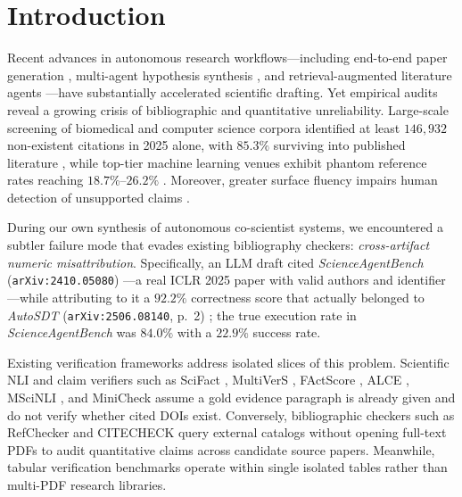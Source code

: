 \documentclass[10pt,twocolumn]{article}
\begin{document}
\section{Introduction}
Recent advances in autonomous research workflows---including end-to-end paper generation \cite{lu2024aiscientist}, multi-agent hypothesis synthesis \cite{gottweis2025coscientist,mitchener2025kosmos}, and retrieval-augmented literature agents \cite{skarlinski2024paperqa2,fischer2026muninai}---have substantially accelerated scientific drafting. Yet empirical audits reveal a growing crisis of bibliographic and quantitative unreliability. Large-scale screening of biomedical and computer science corpora identified at least $146{,}932$ non-existent citations in 2025 alone, with $85.3\%$ surviving into published literature \cite{zhao2026hallucinations}, while top-tier machine learning venues exhibit phantom reference rates reaching $18.7\%$--$26.2\%$ \cite{russinovich2026phantom}. Moreover, greater surface fluency impairs human detection of unsupported claims \cite{liu2023verifiability,li2024attributionbench}.

During our own synthesis of autonomous co-scientist systems, we encountered a subtler failure mode that evades existing bibliography checkers: \emph{cross-artifact numeric misattribution}. Specifically, an LLM draft cited \emph{ScienceAgentBench} (\texttt{arXiv:2410.05080}) \cite{chen2025scienceagentbench}---a real ICLR 2025 paper with valid authors and identifier---while attributing to it a $92.2\%$ correctness score that actually belonged to \emph{AutoSDT} (\texttt{arXiv:2506.08140}, p.~2) \cite{li2025autosdt}; the true execution rate in \emph{ScienceAgentBench} was $84.0\%$ with a $22.9\%$ success rate.

Existing verification frameworks address isolated slices of this problem. Scientific NLI and claim verifiers such as SciFact \cite{wadden2020scifact}, MultiVerS \cite{wadden2022multivers}, FActScore \cite{min2023factscore}, ALCE \cite{gao2023alce}, MSciNLI \cite{sadat2024mscinli}, and MiniCheck \cite{tang2024minicheck} assume a gold evidence paragraph is already given and do not verify whether cited DOIs exist. Conversely, bibliographic checkers such as RefChecker \cite{russinovich2026phantom} and CITECHECK \cite{khajavi2026citecheck} query external catalogs without opening full-text PDFs to audit quantitative claims across candidate source papers. Meanwhile, tabular verification benchmarks \cite{aly2021feverous,lu2023scitab,venktesh2024quantemp,wang2026scitarc,boschen2026tableparser} operate within single isolated tables rather than multi-PDF research libraries.
\end{document}
